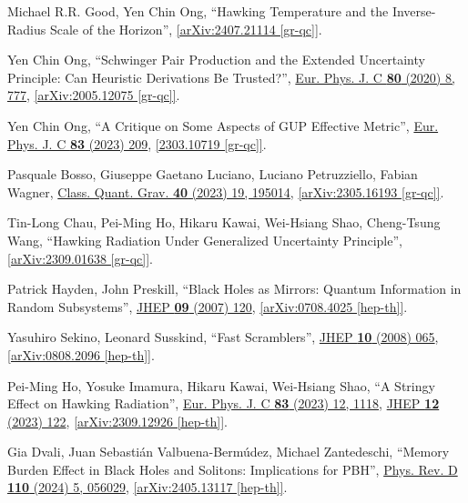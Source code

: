 \documentclass[12pt,preprintnumbers, floatfix, preprintnumbers, letterpaper, superscriptaddress,nofootinbib]{revtex4-2}
\begin{document}
\begin{thebibliography}{99}
Michael R.R. Good, Yen Chin Ong, ``Hawking Temperature and the Inverse-Radius Scale of the Horizon'', \href{https://arxiv.org/abs/2407.21114}{[arXiv:2407.21114 [gr-qc]]}.

Yen Chin Ong, ``Schwinger Pair Production and the Extended Uncertainty Principle: Can Heuristic Derivations Be Trusted?'', {\href{https://link.springer.com/article/10.1140/epjc/s10052-020-8363-2}{Eur. Phys. J. C \textbf{80} (2020) 8, 777}}, \href{https://arxiv.org/abs/2005.12075}{[arXiv:2005.12075 [gr-qc]]}.

Yen Chin Ong, ``A Critique on Some Aspects of GUP Effective Metric'', {\href{https://link.springer.com/article/10.1140/epjc/s10052-023-11360-x}{Eur. Phys. J. C \textbf{83} (2023) 209}}, \href{https://arxiv.org/abs/2303.10719}{[2303.10719 [gr-qc]]}.

Pasquale Bosso, Giuseppe Gaetano Luciano, Luciano Petruzziello, Fabian Wagner, {\href{https://iopscience.iop.org/article/10.1088/1361-6382/acf021}{Class. Quant. Grav. \textbf{40} (2023) 19, 195014}}, \href{https://arxiv.org/abs/2305.16193}{[arXiv:2305.16193 [gr-qc]]}.

Tin-Long Chau, Pei-Ming Ho, Hikaru Kawai, Wei-Hsiang Shao, Cheng-Tsung Wang, ``Hawking Radiation Under Generalized Uncertainty Principle'', \href{https://arxiv.org/abs/2309.01638}{[arXiv:2309.01638 [gr-qc]]}. 

Patrick Hayden, John Preskill, ``Black Holes as Mirrors: Quantum Information in Random Subsystems'', {\href{https://iopscience.iop.org/article/10.1088/1126-6708/2007/09/120}{JHEP \textbf{09} (2007) 120}}, \href{https://arxiv.org/abs/0708.4025}{[arXiv:0708.4025 [hep-th]]}.

Yasuhiro Sekino, Leonard Susskind, ``Fast Scramblers'', {\href{https://iopscience.iop.org/article/10.1088/1126-6708/2008/10/065}{JHEP \textbf{10} (2008) 065}}, \href{https://arxiv.org/abs/0808.2096}{[arXiv:0808.2096 [hep-th]]}.

Pei-Ming Ho, Yosuke Imamura, Hikaru Kawai, Wei-Hsiang Shao, ``A Stringy Effect on Hawking Radiation'', {\href{https://link.springer.com/article/10.1140/epjc/s10052-023-12302-3}{Eur. Phys. J. C \textbf{83} (2023) 12, 1118}}, {\href{https://link.springer.com/article/10.1007/JHEP12(2023)122}{JHEP \textbf{12} (2023) 122}}, \href{https://arxiv.org/abs/2309.12926}{[arXiv:2309.12926 [hep-th]]}.

Gia Dvali, Juan Sebastián Valbuena-Bermúdez, Michael Zantedeschi, ``Memory Burden Effect in Black Holes and Solitons: Implications for PBH'', {\href{https://journals.aps.org/prd/abstract/10.1103/PhysRevD.110.056029}{Phys. Rev. D \textbf{110} (2024) 5, 056029}}, \href{https://arxiv.org/abs/2405.13117}{[arXiv:2405.13117 [hep-th]]}.


\end{thebibliography}
\end{document}
